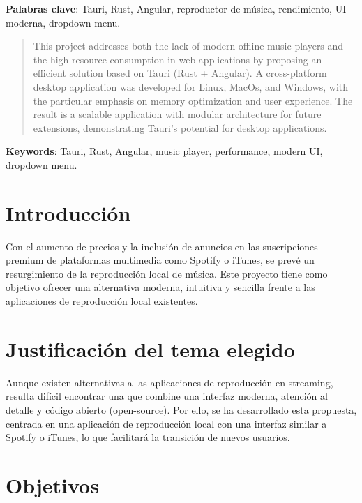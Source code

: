 \documentclass[11pt, a4paper]{article}
\begin{document}
\noindent \textbf{Palabras clave}: Tauri, Rust, Angular, reproductor de música, rendimiento, UI moderna, dropdown menu.

\begin{abstract}
    This project addresses both the lack of modern offline music players and the high resource consumption in web applications by proposing an efficient solution based on Tauri (Rust + Angular). A cross-platform desktop application was developed for Linux, MacOs, and Windows, with the particular emphasis on memory optimization and user experience. The result is a scalable application with modular architecture for future extensions, demonstrating Tauri's potential for desktop applications.
\end{abstract}

\noindent \textbf{Keywords}: Tauri, Rust, Angular, music player, performance, modern UI, dropdown menu.


\clearpage

\tableofcontents
\listoffigures
\listoftables
\lstlistoflistings


\clearpage


\setcounter{page}{1}
\section{Introducción}

Con el aumento de precios y la inclusión de anuncios en las suscripciones premium de plataformas multimedia como Spotify o iTunes, se prevé un resurgimiento de la reproducción local de música. Este proyecto tiene como objetivo ofrecer una alternativa moderna, intuitiva y sencilla frente a las aplicaciones de reproducción local existentes.


\section{Justificación del tema elegido}

Aunque existen alternativas a las aplicaciones de reproducción en streaming, resulta difícil encontrar una que combine una interfaz moderna, atención al detalle y código abierto (open-source). Por ello, se ha desarrollado esta propuesta, centrada en una aplicación de reproducción local con una interfaz similar a Spotify o iTunes, lo que facilitará la transición de nuevos usuarios.

\section{Objetivos}
\end{document}
